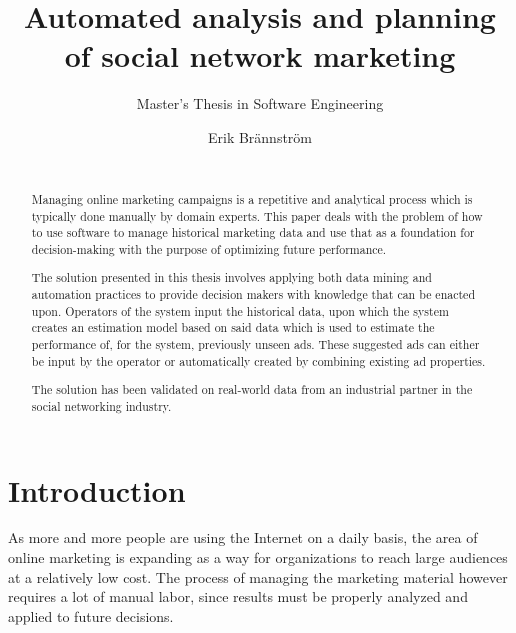 \documentclass{sig-alternate}
\begin{document}
\title{Automated analysis and planning of social network marketing}
\subtitle{Master's Thesis in Software Engineering}

\author{
\alignauthor
Erik Brännström\\
       \\
}

\maketitle

\begin{abstract}
Managing online marketing campaigns is a repetitive and analytical process which is typically done manually by domain experts. This paper deals with the problem of how to use software to manage historical marketing data and use that as a foundation for decision-making with the purpose of optimizing future performance.

The solution presented in this thesis involves applying both data mining and automation practices to provide decision makers with knowledge that can be enacted upon. Operators of the system input the historical data, upon which the system creates an estimation model based on said data which is used to estimate the performance of, for the system, previously unseen ads. These suggested ads can either be input by the operator or automatically created by combining existing ad properties.

The solution has been validated on real-world data from an industrial partner in the social networking industry.

\end{abstract}



\section{Introduction}
As more and more people are using the Internet on a daily basis, the area of online marketing is expanding as a way for organizations to reach large audiences at a relatively low cost. The process of managing the marketing material however requires a lot of manual labor, since results must be properly analyzed and applied to future decisions.
\end{document}
